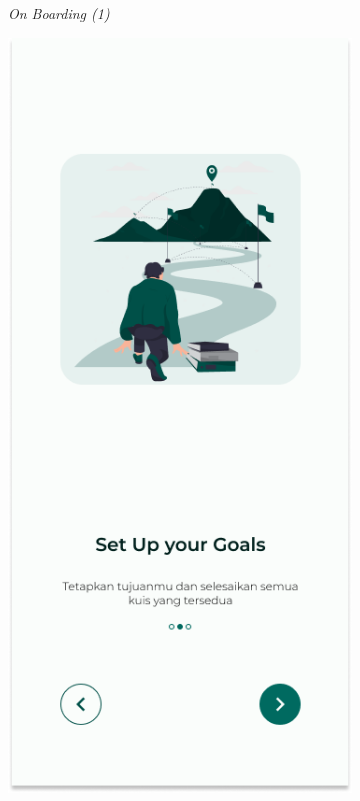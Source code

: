 \begin{figure}[H]
\begin{subfigure}[b]{0.25\textwidth}
	  \caption{\textit{On Boarding (1)}}
	  \label{fig:HasilBoarding}
	\end{subfigure}
	\begin{subfigure}[b]{0.25\textwidth}
		\centering
	  \includegraphics[width=\linewidth]{contents/chapter-3/images/HF-Boarding-2.png}

\end{subfigure}
\end{figure}

